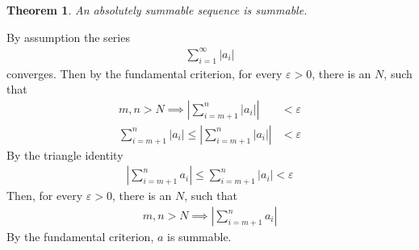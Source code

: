 \documentclass{amsart}
\numberwithin{equation}{section}
\let\oldendproof\endproof
\renewenvironment{proof}[1][\proofname]{%
  \setcounter{case}{0}
  \setcounter{step}{0}
  \oldproof[#1]%
}{\oldendproof}
\theoremstyle{plain}
\newtheorem{theorem}{Theorem}[section]
\theoremstyle{definition}
\theoremstyle{remark}
\begin{document}
\begin{theorem}
  An absolutely summable sequence is summable.
\end{theorem}
\begin{proof}
  By assumption the series
  \begin{align}
    \sum^\infty_{i=1} |a_i|
  \end{align}
  converges. Then by the fundamental criterion, for every $\varepsilon>0$, there is an $N$, such that
  \begin{align}
    m,n > N \implies \left| \sum^n_{i=m+1} |a_i| \right|&< \varepsilon\\
    \sum^n_{i=m+1} |a_i| \leq \left| \sum^n_{i=m+1} |a_i| \right|&< \varepsilon
  \end{align}
  By the triangle identity
  \begin{align}
    \left|\sum^n_{i=m+1} a_i\right|\leq \sum^n_{i=m+1} |a_i|< \varepsilon
  \end{align}
  Then, for every $\varepsilon>0$, there is an $N$, such that
  \begin{align}
    m,n >N \implies \left|\sum^n_{i=m+1} a_i\right|
  \end{align}
  By the fundamental criterion, $a$ is summable.
\end{proof}
\end{document}

